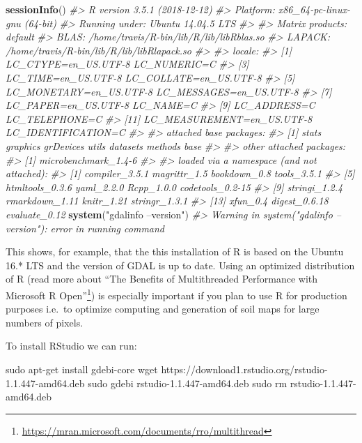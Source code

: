 \documentclass[graybox,natbib,nospthms,UStrade]{svmono}
\newenvironment{Shaded}{\begin{snugshade}}{\end{snugshade}}
\newcommand{\CommentTok}[1]{\textcolor[rgb]{0.37,0.37,0.37}{\textit{#1}}}
\newcommand{\FunctionTok}[1]{\textcolor[rgb]{0,0,0}{#1}}
\newcommand{\KeywordTok}[1]{\textcolor[rgb]{0.27,0.27,0.27}{\textbf{#1}}}
\newcommand{\NormalTok}[1]{#1}
\newcommand{\StringTok}[1]{\textcolor[rgb]{0.5,0.5,0.5}{#1}}
\renewcommand{\href}[2]{#2 (\url{#1})}
\renewcommand{\href}[2]{#2\footnote{\url{#1}}}
\begin{document}
\begin{Shaded}
\begin{Highlighting}[]
\KeywordTok{sessionInfo}\NormalTok{()}
\CommentTok{#> R version 3.5.1 (2018-12-12)}
\CommentTok{#> Platform: x86_64-pc-linux-gnu (64-bit)}
\CommentTok{#> Running under: Ubuntu 14.04.5 LTS}
\CommentTok{#> }
\CommentTok{#> Matrix products: default}
\CommentTok{#> BLAS: /home/travis/R-bin/lib/R/lib/libRblas.so}
\CommentTok{#> LAPACK: /home/travis/R-bin/lib/R/lib/libRlapack.so}
\CommentTok{#> }
\CommentTok{#> locale:}
\CommentTok{#>  [1] LC_CTYPE=en_US.UTF-8       LC_NUMERIC=C              }
\CommentTok{#>  [3] LC_TIME=en_US.UTF-8        LC_COLLATE=en_US.UTF-8    }
\CommentTok{#>  [5] LC_MONETARY=en_US.UTF-8    LC_MESSAGES=en_US.UTF-8   }
\CommentTok{#>  [7] LC_PAPER=en_US.UTF-8       LC_NAME=C                 }
\CommentTok{#>  [9] LC_ADDRESS=C               LC_TELEPHONE=C            }
\CommentTok{#> [11] LC_MEASUREMENT=en_US.UTF-8 LC_IDENTIFICATION=C       }
\CommentTok{#> }
\CommentTok{#> attached base packages:}
\CommentTok{#> [1] stats     graphics  grDevices utils     datasets  methods   base     }
\CommentTok{#> }
\CommentTok{#> other attached packages:}
\CommentTok{#> [1] microbenchmark_1.4-6}
\CommentTok{#> }
\CommentTok{#> loaded via a namespace (and not attached):}
\CommentTok{#>  [1] compiler_3.5.1   magrittr_1.5     bookdown_0.8     tools_3.5.1     }
\CommentTok{#>  [5] htmltools_0.3.6  yaml_2.2.0       Rcpp_1.0.0       codetools_0.2-15}
\CommentTok{#>  [9] stringi_1.2.4    rmarkdown_1.11   knitr_1.21       stringr_1.3.1   }
\CommentTok{#> [13] xfun_0.4         digest_0.6.18    evaluate_0.12}
\KeywordTok{system}\NormalTok{(}\StringTok{"gdalinfo --version"}\NormalTok{)}
\CommentTok{#> Warning in system("gdalinfo --version"): error in running command}
\end{Highlighting}
\end{Shaded}

This shows, for example, that the this installation of R is based on the Ubuntu 16.* LTS and the version of GDAL is up to date. Using an optimized distribution of R (read more about \href{https://mran.microsoft.com/documents/rro/multithread}{``The Benefits of Multithreaded Performance with Microsoft R Open''}) is especially important if you plan to use R for production purposes i.e.~to optimize computing and generation of soil maps for large numbers of pixels.

To install RStudio we can run:

\begin{Shaded}
\begin{Highlighting}[]
\FunctionTok{sudo}\NormalTok{ apt-get install gdebi-core}
\FunctionTok{wget}\NormalTok{ https://download1.rstudio.org/rstudio-1.1.447-amd64.deb }
\FunctionTok{sudo}\NormalTok{ gdebi rstudio-1.1.447-amd64.deb}
\FunctionTok{sudo}\NormalTok{ rm rstudio-1.1.447-amd64.deb}
\end{Highlighting}
\end{Shaded}
\end{document}
